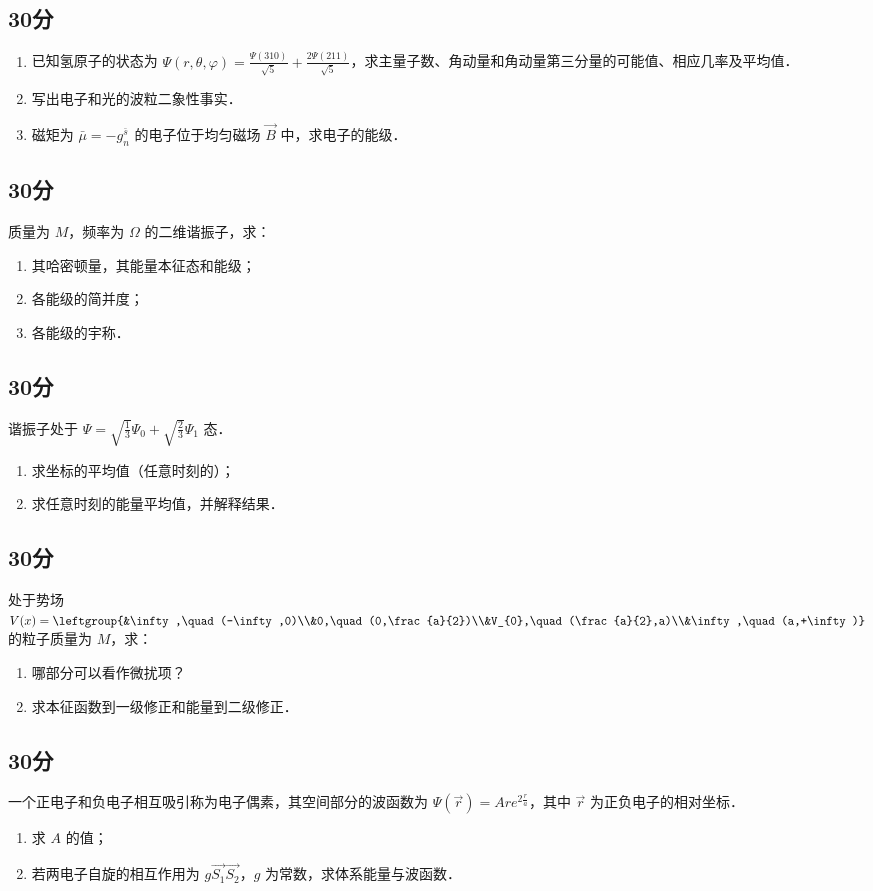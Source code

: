 
\subsection{30分}
\begin{enumerate}
\item 已知氢原子的状态为 $\varPsi (r,\theta,\varphi)=\frac{\varPsi (310)}{\sqrt{5}}+\frac{2\varPsi (211)}{\sqrt{5}}$，求主量子数、角动量和角动量第三分量的可能值、相应几率及平均值．
\item 写出电子和光的波粒二象性事实．
\item 磁矩为 $\bar{\mu}=-g^{\bar{s}}_{n}$ 的电子位于均匀磁场 $\vec{B}$ 中，求电子的能级．
\end{enumerate}
\subsection{30分}
质量为 $M$，频率为 $\Omega$ 的二维谐振子，求：
\begin{enumerate}
\item 其哈密顿量，其能量本征态和能级；
\item 各能级的简并度；
\item 各能级的宇称．
\end{enumerate}
\subsection{30分}
谐振子处于 $\varPsi =\sqrt{\frac{1}{3}}\varPsi_{0}+\sqrt{\frac{2}{3}}\varPsi_{1}$ 态．
\begin{enumerate}
\item 求坐标的平均值（任意时刻的）；
\item 求任意时刻的能量平均值，并解释结果．
\end{enumerate}
\subsection{30分}
处于势场 $V(x)=\leftgroup{&\infty,\quad (-\infty,0)\\&0,\quad (0,\frac{a}{2})\\&V_{0},\quad (\frac{a}{2},a)\\&\infty,\quad (a,+\infty)}$ 的粒子质量为 $M$，求：
\begin{enumerate}
\item 哪部分可以看作微扰项？
\item 求本征函数到一级修正和能量到二级修正．
\end{enumerate}
\subsection{30分}
一个正电子和负电子相互吸引称为电子偶素，其空间部分的波函数为 $\varPsi (\vec{r})=Are^{2\frac{r}{a}}$，其中 $\vec{r}$ 为正负电子的相对坐标．
\begin{enumerate}
\item 求 $A$ 的值；
\item 若两电子自旋的相互作用为 $g\vec{S_{1}}\vec{S_{2}}$，$g$ 为常数，求体系能量与波函数．
\end{enumerate}